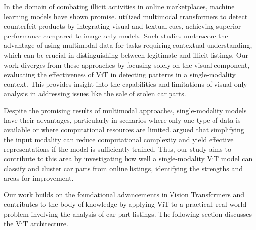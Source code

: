 In the domain of combating illicit activities in online marketplaces, machine learning models have shown promise. \citet{rashid2024aisafetypracticeenhancing} utilized multimodal transformers to detect counterfeit products by integrating visual and textual cues, achieving superior performance compared to image-only models. Such studies underscore the advantage of using multimodal data for tasks requiring contextual understanding, which can be crucial in distinguishing between legitimate and illicit listings. Our work diverges from these approaches by focusing solely on the visual component, evaluating the effectiveness of ViT in detecting patterns in a single-modality context. This provides insight into the capabilities and limitations of visual-only analysis in addressing issues like the sale of stolen car parts.

Despite the promising results of multimodal approaches, single-modality models have their advantages, particularly in scenarios where only one type of data is available or where computational resources are limited. \citet{wu2020visualtransformerstokenbasedimage} argued that simplifying the input modality can reduce computational complexity and yield effective representations if the model is sufficiently trained. Thus, our study aims to contribute to this area by investigating how well a single-modality ViT model can classify and cluster car parts from online listings, identifying the strengths and areas for improvement.

Our work builds on the foundational advancements in Vision Transformers and contributes to the body of knowledge by applying ViT to a practical, real-world problem involving the analysis of car part listings. The following section discusses the ViT architecture.
